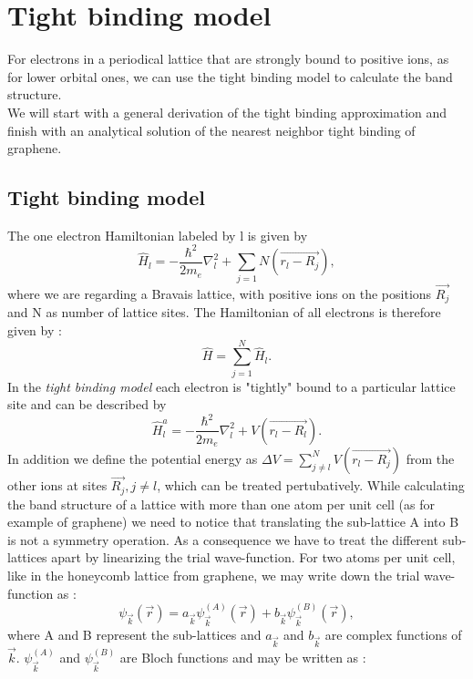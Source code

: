 \chapter{Tight binding model}
	For electrons in a periodical lattice that are strongly bound to positive ions, as for lower orbital ones, we can use the tight binding model to calculate the band structure. \\
	We will start with a general derivation of the tight binding approximation and finish with an analytical solution of the nearest neighbor tight binding of graphene.
		
	\section{Tight binding model}
		The one electron Hamiltonian labeled by l is given by
		\begin{equation}
			\hat H_l = - \frac{\hbar^2}{2m_e} \nabla_l^2 + \sum_{j=1}{N}(\vec{r_l - R_j}),
		\end{equation}
		where we are regarding a Bravais lattice, with positive ions on the positions $\vec{R_j}$ and N as number of lattice sites. The Hamiltonian of all electrons is therefore given by : 
		\begin{equation}
			\hat H = \sum_{j=1}^{N} \hat H_l.
		\end{equation}
		In the \textit{tight binding model} each electron is "tightly" bound to a particular lattice site and can be described by
		\begin{equation}
			\hat H_l^a = - \frac{\hbar^2}{2m_e} \nabla_l^2 + V(\vec{r_l - R_l}).
		\end{equation}
		In addition we define the potential energy as $\Delta V = \sum_{j \neq l}^N V(\vec{r_l - R_j})$ from the other ions at sites $\vec{R_j}, j \neq l$, which can be treated pertubatively. While calculating the band structure of a lattice with more than one atom per unit cell (as for example of graphene) we need to notice that translating the sub-lattice A into B is not a symmetry operation. As a consequence we have to treat the different sub-lattices apart by linearizing the trial wave-function. For two atoms per unit cell, like in the honeycomb lattice from graphene, we may write down the trial wave-function as :
		\begin{equation}
			\label{eq:tightBindingPsiSum}
			\psi_\vec k (\vec{r}) = a_\vec k  \psi_\vec k^{(A)} (\vec r) + b_\vec k \psi_\vec k^{(B)}(\vec r),
		\end{equation}
		where A and B represent the sub-lattices and $a_\vec k$ and $b_\vec k$ are complex functions of $\vec k$. $\psi_\vec k^{(A)}$ and $\psi_\vec k^{(B)}$ are Bloch functions and may be written as : 
